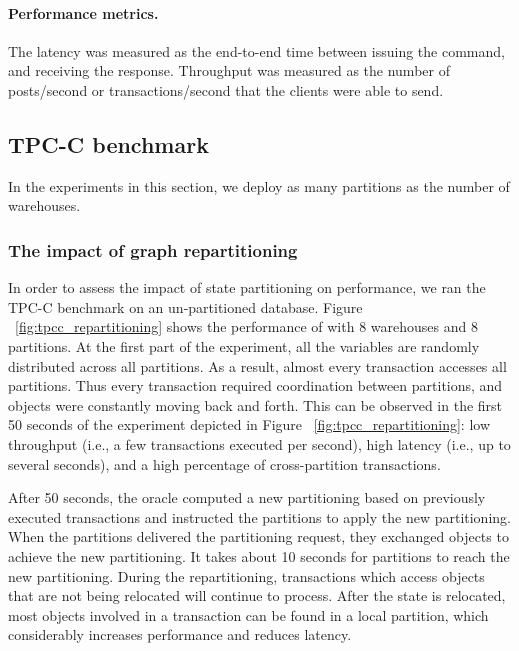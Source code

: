 \paragraph*{Performance metrics.}
The latency was measured as the end-to-end time between issuing the command, and
receiving the response.  Throughput was measured as the number of posts/second
or transactions/second that the clients were able to send.

\subsection{TPC-C benchmark}
\label{sec:dynastar-evaluation:tpc-c}

In the experiments in this section, we deploy as many partitions as the number
of warehouses.

\subsubsection{The impact of graph repartitioning}
In order to assess the impact of state partitioning on performance, we ran the
TPC-C benchmark on an un-partitioned database.  Figure
~\ref{fig:tpcc_repartitioning} shows the performance of \dynastar with 8
warehouses and 8 partitions. At the first part of the experiment, all the
variables are randomly distributed across all partitions. As a result, almost
every transaction accesses all partitions. Thus every transaction required
coordination between partitions, and objects were constantly moving back and
forth. This can be observed in the first 50 seconds of the experiment depicted
in Figure ~\ref{fig:tpcc_repartitioning}: low throughput (i.e., a few
transactions executed per second), high latency (i.e., up to several seconds),
and a high percentage of cross-partition transactions.

After 50 seconds, the oracle computed a new partitioning based on previously
executed transactions and instructed the partitions to apply the new
partitioning. When the partitions delivered the partitioning request, they
exchanged objects to achieve the new partitioning. It takes about 10 seconds for
partitions to reach the new partitioning. During the repartitioning,
transactions which access objects that are not being relocated will continue to
process. After the state is relocated, most objects involved in a transaction
can be found in a local partition, which considerably increases performance and
reduces latency.


